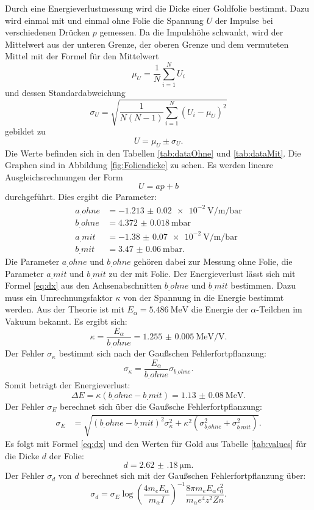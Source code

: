 Durch eine Energieverlustmessung wird die Dicke einer Goldfolie bestimmt. Dazu wird einmal mit und einmal ohne Folie die Spannung $U$ der Impulse bei verschiedenen Drücken $p$ gemessen. Da die Impulshöhe schwankt, wird der Mittelwert aus der unteren Grenze, der oberen Grenze und dem vermuteten Mittel mit der Formel für den Mittelwert
\[
\mu_U = \frac{1}{N}\sum_{i=1}^N U_i
\]
und dessen Standardabweichung
\[
\sigma_U = \sqrt{\frac{1}{N(N-1)}\sum_{i=1}^N (U_i-\mu_U)^2}
\]
gebildet zu
\[
U = \mu_U \pm \sigma_U \text{.}
\]
Die Werte befinden sich in den Tabellen \ref{tab:dataOhne} und \ref{tab:dataMit}. Die Graphen sind in Abbildung \ref{fig:Foliendicke} zu sehen.
Es werden lineare Ausgleichsrechnungen der Form
\[
U = ap + b
\]
durchgeführt. Dies ergibt die Parameter:
\begin{align*}
a_.{ohne} &= \SI{-1.213(20)e-2}{\volt\per\milli\per\bar}\\
b_.{ohne} &= \SI{4.372(18)}{\milli\bar}\\
a_.{mit}  &= \SI{-1.38(7)e-2}{\volt\per\milli\per\bar}\\
b_.{mit}  &= \SI{3.47(6)}{\milli\bar}\text{.}
\end{align*}
Die Parameter $a_.{ohne}$ und $b_.{ohne}$ gehören dabei zur Messung ohne Folie, die Parameter $a_.{mit}$ und $b_.{mit}$ zu der mit Folie.
Der Energieverlust lässt sich mit Formel \eqref{eq:dx} aus den Achsenabschnitten $b_.{ohne}$ und $b_.{mit}$ bestimmen. Dazu muss ein Umrechnungsfaktor $\kappa$ von der Spannung in die Energie bestimmt werden. Aus der Theorie ist mit $E_\alpha=\SI{5,486}{\mega\electronvolt}$ die Energie der $\alpha$-Teilchen im Vakuum bekannt. Es ergibt sich:
\[
\kappa = \frac{E_\alpha}{b_.{ohne}} = \SI{1.255(5)}{\mega\electronvolt\per\volt}\text{.}
\]
Der Fehler $\sigma_\kappa$ bestimmt sich nach der Gaußschen Fehlerfortpflanzung:
\[
\sigma_\kappa = \frac{E_\alpha}{b_.{ohne}}\sigma_{b_.{ohne}}\text{.}
\]
Somit beträgt der Energieverlust:
\[
\Delta E = \kappa(b_.{ohne}-b_.{mit}) = \SI{1.13(8)}{\mega\electronvolt} \text{.}
\]
Der Fehler $\sigma_E$ berechnet sich über die Gaußsche Fehlerfortpflanzung:
\begin{align*}
\sigma_E &= \sqrt{(b_.{ohne}-b_.{mit})^2\sigma_\kappa^2+\kappa^2\left(\sigma_{b_.{ohne}}^2+\sigma_{b_.{mit}}^2\right)}\text{.}
\end{align*}
Es folgt mit Formel \eqref{eq:dx} und den Werten für Gold aus Tabelle \ref{tab:values} für die Dicke $d$ der Folie:
\[
d = \SI{2.62(18)}{\micro\metre}\text{.}
\]
Der Fehler $\sigma_d$ von $d$ berechnet sich mit der Gaußschen Fehlerfortpflanzung über:
\[
\sigma_d = \sigma_E\log\left(\frac{4m_eE_\alpha}{m_\alpha I}\right)^{-1}\frac{8\pi m_eE_\alpha\epsilon_0^2}{m_\alpha e^4z^2Zn}\text{.}
\]


